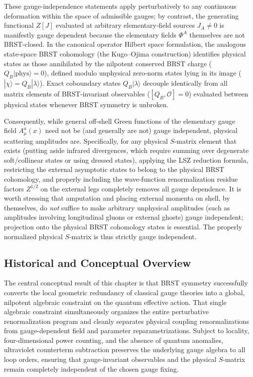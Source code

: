 These gauge-independence statements apply perturbatively to any continuous deformation within the space of admissible gauges; by contrast, the generating functional \(Z[J]\) evaluated at arbitrary elementary-field sources \(J_A \neq 0\) is manifestly gauge dependent because the elementary fields \(\Phi^A\) themselves are not BRST-closed. In the canonical operator Hilbert space formulation, the analogous state-space BRST cohomology (the Kugo--Ojima construction) identifies physical states as those annihilated by the nilpotent conserved BRST charge (\(Q_B |\text{phys}\rangle = 0\)), defined modulo unphysical zero-norm states lying in its image (\(|\chi\rangle = Q_B |\lambda\rangle\)). Exact coboundary states \(Q_B |\lambda\rangle\) decouple identically from all matrix elements of BRST-invariant observables (\([Q_B, \mathcal{O}] = 0\)) evaluated between physical states whenever BRST symmetry is unbroken.

Consequently, while general off-shell Green functions of the elementary gauge field \(A_\mu^a(x)\) need not be (and generally are not) gauge independent, physical scattering amplitudes are. Specifically, for any physical \(S\)-matrix element that exists (putting aside infrared divergences, which require summing over degenerate soft/collinear states or using dressed states), applying the LSZ reduction formula, restricting the external asymptotic states to belong to the physical BRST cohomology, and properly including the wave-function renormalization residue factors \(Z^{1/2}\) on the external legs completely removes all gauge dependence. It is worth stressing that amputation and placing external momenta on shell, by themselves, do \textit{not} suffice to make arbitrary unphysical amplitudes (such as amplitudes involving longitudinal gluons or external ghosts) gauge independent; projection onto the physical BRST cohomology states is essential. The properly normalized physical \(S\)-matrix is thus strictly gauge independent.

\subsection{Historical and Conceptual Overview}

The central conceptual result of this chapter is that BRST symmetry successfully converts the local geometric redundancy of classical gauge theories into a global, nilpotent algebraic constraint on the quantum effective action. That single algebraic constraint simultaneously organizes the entire perturbative renormalization program and cleanly separates physical coupling renormalizations from gauge-dependent field and parameter reparametrizations. Subject to locality, four-dimensional power counting, and the absence of quantum anomalies, ultraviolet counterterm subtraction preserves the underlying gauge algebra to all loop orders, ensuring that gauge-invariant observables and the physical \(S\)-matrix remain completely independent of the chosen gauge fixing.

